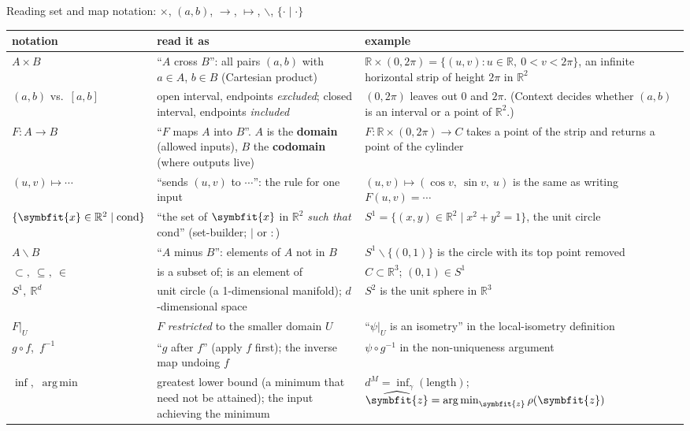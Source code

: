 \documentclass[11pt]{article}
\newcommand{\bm}[1]{\symbfit{#1}}
\newcounter{keyfact}
\newcommand{\R}{\mathbb{R}}
\newcommand{\vx}{\bm{x}}
\DeclareMathOperator*{\argmin}{arg\,min}
\begin{document}
\begin{keyfactbox}{Reading set and map notation: $\times$, $(a,b)$, $\to$, $\mapsto$, $\smallsetminus$, $\{\cdot\mid\cdot\}$}\label{kf:notation}
{\renewcommand{\arraystretch}{1.35}
\small
\begin{xltabular}{\linewidth}{@{}>{\raggedright\arraybackslash}p{3.0cm}>{\raggedright\arraybackslash}p{4.3cm}>{\raggedright\arraybackslash}X@{}}
\toprule
notation & read it as & example \\
\midrule
\endhead
$A\times B$ & ``$A$ cross $B$'': all pairs $(a,b)$ with $a\in A$, $b\in B$ (Cartesian product) & $\R\times(0,2\pi)=\{(u,v):u\in\R,\ 0<v<2\pi\}$, an infinite horizontal strip of height $2\pi$ in $\R^2$ \\
$(a,b)$ vs.\ $[a,b]$ & open interval, endpoints \emph{excluded}; closed interval, endpoints \emph{included} & $(0,2\pi)$ leaves out $0$ and $2\pi$. (Context decides whether $(a,b)$ is an interval or a point of $\R^2$.) \\
$F:A\to B$ & ``$F$ maps $A$ into $B$''. $A$ is the \textbf{domain} (allowed inputs), $B$ the \textbf{codomain} (where outputs live) & $F:\R\times(0,2\pi)\to C$ takes a point of the strip and returns a point of the cylinder \\
$(u,v)\mapsto\cdots$ & ``sends $(u,v)$ to $\cdots$'': the rule for one input & $(u,v)\mapsto(\cos v,\ \sin v,\ u)$ is the same as writing $F(u,v)=\cdots$ \\
$\{\vx\in\R^2\mid\text{cond}\}$ & ``the set of $\vx$ in $\R^2$ \emph{such that} cond'' (set-builder; $|$ or $:$) & $S^1=\{(x,y)\in\R^2\mid x^2+y^2=1\}$, the unit circle \\
$A\smallsetminus B$ & ``$A$ minus $B$'': elements of $A$ not in $B$ & $S^1\smallsetminus\{(0,1)\}$ is the circle with its top point removed \\
$\subset,\ \subseteq,\ \in$ & is a subset of; is an element of & $C\subset\R^3$; $(0,1)\in S^1$ \\
$S^1,\ \R^d$ & unit circle (a 1-dimensional manifold); $d$-dimensional space & $S^2$ is the unit sphere in $\R^3$ \\
$F|_U$ & $F$ \emph{restricted} to the smaller domain $U$ & ``$\psi|_U$ is an isometry'' in the local-isometry definition \\
$g\circ f$,\ $f^{-1}$ & ``$g$ after $f$'' (apply $f$ first); the inverse map undoing $f$ & $\psi\circ g^{-1}$ in the non-uniqueness argument \\
$\inf$,\ $\argmin$ & greatest lower bound (a minimum that need not be attained); the input achieving the minimum & $d^M=\inf_\gamma(\text{length})$; $\widehat{\bm z}=\argmin_{\bm z}\rho(\bm z)$ \\

\end{xltabular}}
\end{keyfactbox}
\end{document}
